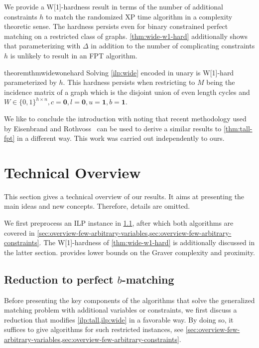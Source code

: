 \documentclass[a4paper,UKenglish,cleveref,thm-restate]{lipics-v2021}
\newcommand{\veczero}{\mathbf0}
\newcommand{\vecone}{\mathbf1}
\begin{document}
We provide a W[1]-hardness result in terms of the number of additional constraints $h$ to match the randomized XP time algorithm in a complexity theoretic sense. The hardness persists even for binary constrained perfect matching on a restricted class of graphs. \cref{thm:wide-w1-hard} additionally shows that parameterizing with $\Delta$ in addition to the number of complicating constraints $h$ is unlikely to result in an FPT algorithm.

\begin{restatable}{theorem}{thmwidewonehard}
    Solving \cref{ilp:wide} encoded in unary is W[1]-hard parameterized by $h$. This hardness persists when restricting to $M$ being the incidence matrix of a graph which is the disjoint union of even length cycles and $W\in\{0,1\}^{h\times n},c=\veczero,l=\veczero,u=\vecone,b=\vecone$.
    \label{thm:wide-w1-hard}
\end{restatable}

We like to conclude the introduction with noting that recent methodology used by Eisenbrand and Rothvoss~\cite{eisenbrand2025parameterizedlinearformulationinteger} can be used to derive a similar results to \cref{thm:tall-fpt} in a different way\iftoggle{ea}{}{, which is presented in \cref{sec:milp-approach-for-tall-fpt}}. This work was carried out independently to ours. 
\section{Technical Overview}\label{sec:overview}
This section gives a technical overview of our results. It aims at presenting the main ideas and new concepts. Therefore, details are omitted. 

We first preprocess an ILP instance in \cref{sec:overview-reduction-to-perfect-b-matching}, after which both algorithms are covered in \cref{sec:overview-few-arbitrary-variables,sec:overview-few-arbitrary-constraints}. The W[1]-hardness of \cref{thm:wide-w1-hard} is additionally discussed in the latter section. \iftoggle{ea}{\cref{sec:lower-bounds}}{\cref{sec:overview-lower-bounds}} provides lower bounds on the Graver complexity and proximity.

\subsection[Reduction to perfect b-matching]{Reduction to perfect $b$-matching}
\label{sec:overview-reduction-to-perfect-b-matching}
Before presenting the key components of the algorithms that solve the generalized matching problem with additional variables or constraints, we first discuss a reduction that modifies \cref{ilp:tall,ilp:wide} in a favorable way. By doing so, it suffices to give algorithms for such restricted instances, see \cref{sec:overview-few-arbitrary-variables,sec:overview-few-arbitrary-constraints}. 
\end{document}
